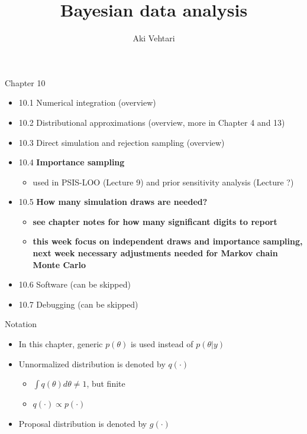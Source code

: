 \documentclass[english,t]{beamer}
\title[]{Bayesian data analysis}
\subtitle{}
\author{Aki Vehtari}
\institute[Aalto]{}
\begin{document}
\begin{frame}{Chapter 10}

  \begin{itemize}
\item 10.1 Numerical integration (overview)
\item 10.2 Distributional approximations (overview, more in Chapter 4 and 13)
\item 10.3 Direct simulation and rejection sampling (overview)
\item 10.4 \textbf{Importance sampling}
  \begin{itemize}
  \item used in PSIS-LOO (Lecture 9) and prior sensitivity analysis (Lecture ?)
  \end{itemize}
\item 10.5 \textbf{How many simulation draws are needed?} 
  \begin{itemize}
  \item \textbf{see chapter notes for how many significant digits to report}
  \item \textbf{this week focus on independent draws and importance sampling,
    next week necessary adjustments needed for Markov chain Monte
    Carlo}
  \end{itemize}
\item 10.6 Software (can be skipped)
\item 10.7 Debugging (can be skipped)
   \end{itemize}
\end{frame}

\begin{frame}{Notation}

  \begin{itemize}
  \item In this chapter, generic $p(\theta)$ is used instead of
    $p(\theta|y)$
  \item Unnormalized distribution is denoted by $q(\cdot)$
    \begin{itemize}
    \item $\int q(\theta) d\theta \neq 1$, but finite
    \item $q(\cdot) \propto p(\cdot)$
    \end{itemize}
  \item Proposal distribution is denoted by $g(\cdot)$
  \end{itemize}

\end{frame}
\end{document}
